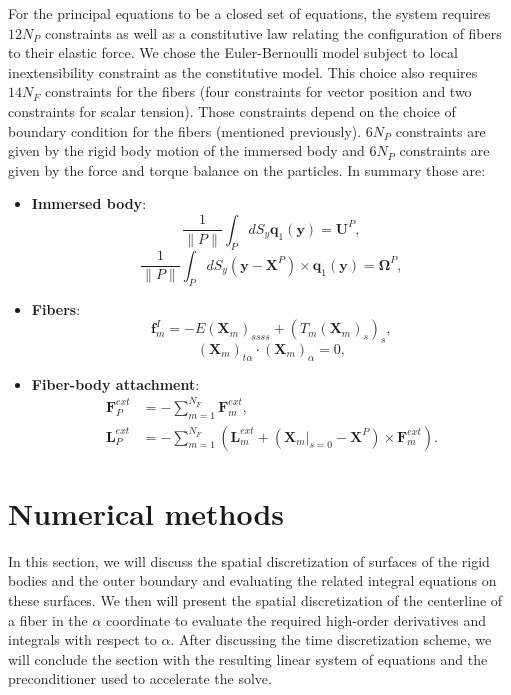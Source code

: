 \documentclass{article}
\newcommand{\OOmega}{\boldsymbol{\Omega}}
\newcommand{\UU}{\mathbf{U}}
\newcommand{\XX}{\mathbf{X}}
\newcommand{\yy}{\mathbf{y}}
\newcommand{\qq}{\mathbf{q}}
\newcommand{\ff}{\mathbf{f}}
\newcommand{\FF}{\mathbf{F}}
\newcommand{\LL}{\mathbf{L}}
\begin{document}
For the principal equations to be a closed set of equations, the system requires $12N_P$ constraints as well as a constitutive law relating the configuration of fibers to their elastic force. We chose the Euler-Bernoulli model subject to local inextensibility constraint as the constitutive model. This choice also requires $14N_F$ constraints for the fibers (four constraints for vector position and two constraints for scalar tension). Those constraints depend on the choice of boundary condition for the fibers (mentioned previously). $6N_P$ constraints are given by the rigid body motion of the immersed body and $6N_P$ constraints are given by the force and torque balance on the particles. In summary those are:
\begin{itemize}
    \item \textbf{Immersed body}:
    \begin{equation}
      \frac{1}{\|P\|}\int_P dS_y \qq_1(\yy) = \UU^P,
    \end{equation}
    \begin{equation}
      \frac{1}{\|P\|}\int_P dS_y (\yy-\XX^P) \times \qq_1(\yy) = \OOmega^P,
    \end{equation}
    \item \textbf{Fibers}:
    \begin{equation}
        \ff_m^I = -E(\XX_m)_{ssss} + (T_m(\XX_m)_s)_s,
    \end{equation}
    \begin{equation}
        (\XX_m)_{t\alpha} \cdot (\XX_m)_{\alpha} = 0,
    \end{equation}
    \item \textbf{Fiber-body attachment}:
    \begin{align}
        \FF^{ext}_P & = -\sum_{m = 1}^{N_F} \FF_m^{ext},\\
        \LL^{ext}_P & = - \sum_{m = 1}^{N_F} \left(\LL_m^{ext} + (\XX_m|_{s=0} - \XX^P)\times \FF_m^{ext} \right).
    \end{align}
\end{itemize}


\section{Numerical methods}
In this section, we will discuss the spatial discretization of surfaces of the rigid bodies and the outer boundary and evaluating the related integral equations on these surfaces. We then will present the spatial discretization of the centerline of a fiber in the $\alpha$ coordinate to evaluate the required high-order derivatives and integrals with respect to $\alpha$. After discussing the time discretization scheme, we will conclude the section with the resulting linear system of equations and the preconditioner used to accelerate the solve.
\end{document}
